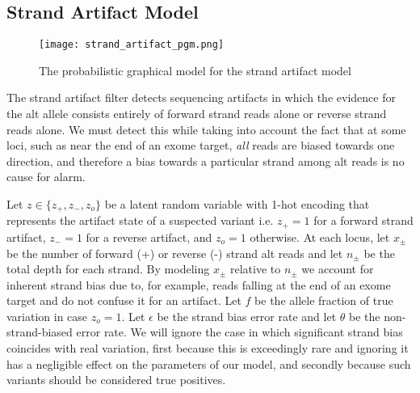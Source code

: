 \documentclass[nofootinbib,amssymb,amsmath]{revtex4}
\begin{document}
\subsection{Strand Artifact Model}

\begin{figure}
\centering
\texttt{[image: strand\_artifact\_pgm.png]}
\caption{\label{fig:strand artifact}The probabilistic graphical model for the strand artifact model}
\end{figure}

The strand artifact filter detects sequencing artifacts in which the evidence for the alt allele consists entirely of forward strand reads alone or reverse strand reads alone. We must detect this while taking into account the fact that at some loci, such as near the end of an exome target, \emph{all} reads are biased towards one direction, and therefore a bias towards a particular strand among alt reads is no cause for alarm.

Let $z \in \{ z_+, z_-, z_o \}$ be a latent random variable with 1-hot encoding that represents the artifact state of a suspected variant i.e. $z_+ = 1$ for a forward strand artifact, $z_- = 1$ for a reverse artifact, and $z_o = 1$ otherwise. At each locus, let $x_\pm$ be the number of forward (+) or reverse (-) strand alt reads and let $n_\pm$ be the total depth for each strand.  By modeling $x_\pm$ relative to $n_\pm$ we account for inherent strand bias due to, for example, reads falling at the end of an exome target and do not confuse it for an artifact.  Let $f$ be the allele fraction of true variation in case $z_o = 1$.  Let $\epsilon$ be the strand bias error rate and let $\theta$ be the non-strand-biased error rate.  We will ignore the case in which significant strand bias coincides with real variation, first because this is exceedingly rare and ignoring it has a negligible effect on the parameters of our model, and secondly because such variants should be considered true positives.
\end{document}
